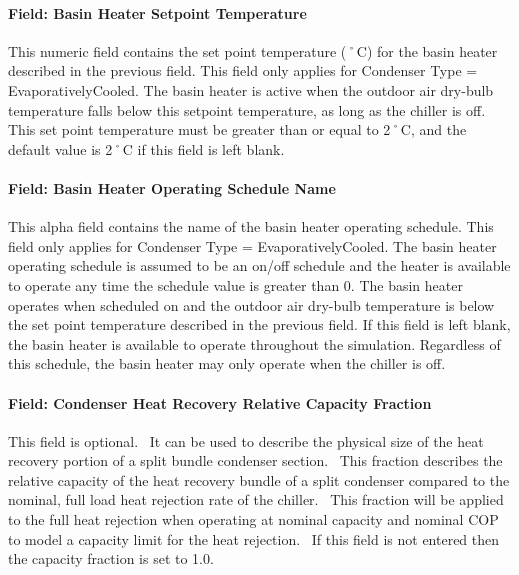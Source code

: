 \paragraph{Field: Basin Heater Setpoint Temperature}\label{field-basin-heater-setpoint-temperature-2-001}

This numeric field contains the set point temperature (˚C) for the basin heater described in the previous field. This field only applies for Condenser Type = EvaporativelyCooled. The basin heater is active when the outdoor air dry-bulb temperature falls below this setpoint temperature, as long as the chiller is off. This set point temperature must be greater than or equal to 2˚C, and the default value is 2˚C if this field is left blank.

\paragraph{Field: Basin Heater Operating Schedule Name}\label{field-basin-heater-operating-schedule-name-2-001}

This alpha field contains the name of the basin heater operating schedule. This field only applies for Condenser Type = EvaporativelyCooled. The basin heater operating schedule is assumed to be an on/off schedule and the heater is available to operate any time the schedule value is greater than 0. The basin heater operates when scheduled on and the outdoor air dry-bulb temperature is below the set point temperature described in the previous field. If this field is left blank, the basin heater is available to operate throughout the simulation. Regardless of this schedule, the basin heater may only operate when the chiller is off.

\paragraph{Field: Condenser Heat Recovery Relative Capacity Fraction}\label{field-condenser-heat-recovery-relative-capacity-fraction-1}

This field is optional.~ It can be used to describe the physical size of the heat recovery portion of a split bundle condenser section.~ This fraction describes the relative capacity of the heat recovery bundle of a split condenser compared to the nominal, full load heat rejection rate of the chiller.~ This fraction will be applied to the full heat rejection when operating at nominal capacity and nominal COP to model a capacity limit for the heat rejection.~ If this field is not entered then the capacity fraction is set to 1.0.


